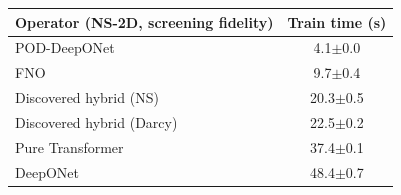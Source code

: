\begin{tabular}{lc}
\toprule
Operator (NS-2D, screening fidelity) & Train time (s) \\
\midrule
POD-DeepONet & 4.1$\pm$0.0 \\
FNO & 9.7$\pm$0.4 \\
Discovered hybrid (NS) & 20.3$\pm$0.5 \\
Discovered hybrid (Darcy) & 22.5$\pm$0.2 \\
Pure Transformer & 37.4$\pm$0.1 \\
DeepONet & 48.4$\pm$0.7 \\
\bottomrule
\end{tabular}